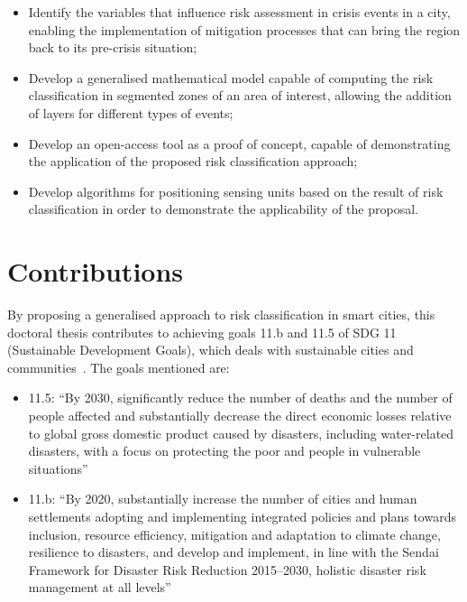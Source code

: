\begin{refsection}
\begin{itemize}
  \item Identify the variables that influence risk assessment in crisis events in a city, enabling the implementation of mitigation processes that can bring the region back to its pre-crisis situation;
  \item Develop a generalised mathematical model capable of computing the risk classification in segmented zones of an area of interest, allowing the addition of layers for different types of events;
  \item Develop an open-access tool as a proof of concept, capable of demonstrating the application of the proposed risk classification approach;
  \item Develop algorithms for positioning sensing units based on the result of risk classification in order to demonstrate the applicability of the proposal.
\end{itemize}

\section{Contributions}\label{sec:contribuicoes}


By proposing a generalised approach to risk classification in smart cities, this doctoral thesis contributes to achieving goals 11.b and 11.5 of SDG 11 (Sustainable Development Goals), which deals with sustainable cities and communities~\cite{ipeaods}. The goals mentioned are:

\begin{itemize}
  \item 11.5: ``By 2030, significantly reduce the number of deaths and the number of people affected and substantially decrease the direct economic losses relative to global gross domestic product caused by disasters, including water-related disasters, with a focus on protecting the poor and people in vulnerable situations''
  \item 11.b: ``By 2020, substantially increase the number of cities and human settlements adopting and implementing integrated policies and plans towards inclusion, resource efficiency, mitigation and adaptation to climate change, resilience to disasters, and develop and implement, in line with the Sendai Framework for Disaster Risk Reduction 2015--2030, holistic disaster risk management at all levels''
\end{itemize}


\end{refsection}
